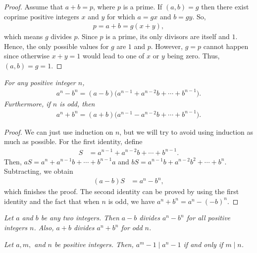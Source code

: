 \documentclass{subfile}
\begin{document}
	\begin{proof}
		Assume that $a+b=p$, where $p$ is a prime. If $(a,b)=g$ then there exist coprime positive integers $x$ and $y$ for which $a=gx$ and $b=gy$. So,
		\begin{align*}
			p = a+b = g(x+y),
		\end{align*}
		which means $g$ divides $p$. Since $p$ is a prime, its only divisors are itself and $1$. Hence, the only possible values for $g$ are $1$ and $p$. However, $g=p$ cannot happen since otherwise $x+y=1$ would lead to one of $x$ or $y$ being zero. Thus, $(a,b)=g=1$.
	\end{proof}


	\begin{theorem}\slshape\label{id:fatandthin}
		For any positive integer $n$,
		\begin{align*}
			a^n-b^n=(a-b)\Big(a^{n-1}+a^{n-2}b+\cdots+b^{n-1}\Big).
		\end{align*}
		Furthermore, if $n$ is odd, then
		\begin{align*}
			a^n+b^n=(a+b)\Big(a^{n-1}-a^{n-2}b+\cdots+b^{n-1}\Big).
		\end{align*}
		\label{thm:powDiv}
	\end{theorem}
	\begin{proof}
		We can just use induction on $n$, but we will try to avoid using induction as much as possible. For the first identity, define
		\begin{align*}
			S & =a^{n-1}+a^{n-2}b+\cdots+b^{n-1}.
		\end{align*}
		Then, $aS=a^n+a^{n-1}b+\cdots+b^{n-1}a$ and $bS=a^{n-1}b+a^{n-2}b^2+\cdots+b^n$. Subtracting, we obtain
		\begin{align*}
			(a-b)S & =a^n-b^n,
		\end{align*}
		which finishes the proof. The second identity can be proved by using the first identity and the fact that when $n$ is odd, we have $a^n+b^n=a^n-(-b)^n$.
	\end{proof}

	\begin{corollary}\slshape
		\label{cor:a-b|a^n-b^n}
		Let $a$ and $b$ be any two integers. Then $a-b$ divides $a^n-b^n$ for all positive integers $n$. Also, $a+b$ divides $a^n+b^n$ for odd $n$.
	\end{corollary}


	\begin{theorem}\slshape\label{thm:powerdiv}
		Let $a,m,$ and $n$ be positive integers. Then, $a^m-1\mid a^n-1$ if and only if $m\mid n$.
	\end{theorem}
\end{document}
